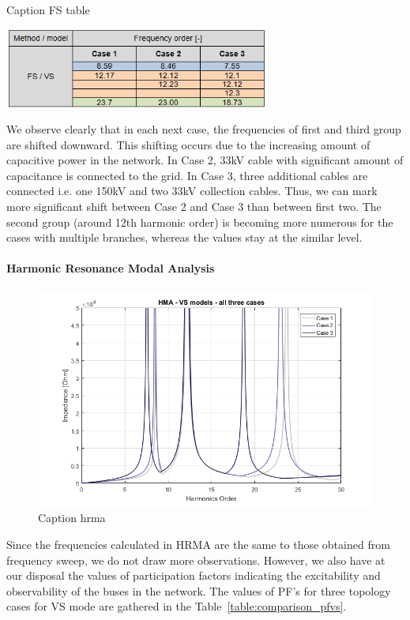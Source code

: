 \documentclass[12pt]{report} %
\begin{document}
\begin{table}[htb]
	\centering
	\caption{Caption FS table}
	\includegraphics[width=0.65\textwidth]{img/Case123/FS_VS_table.png}
  	\label{table:comparison_fsvs}
\end{table}
\FloatBarrier

We observe clearly that in each next case, the frequencies of first and third group are shifted downward. This shifting occurs due to the increasing amount of capacitive power in the network. In Case 2, 33kV cable with significant amount of capacitance is connected to the grid. In Case 3, three additional cables are connected i.e. one 150kV  and two 33kV collection cables. Thus, we can mark more significant shift between Case 2 and Case 3 than between first two.
The second group (around 12th harmonic order) is becoming more numerous for the cases with multiple branches, whereas the values stay at the similar level. 

\paragraph{Harmonic Resonance Modal Analysis}
\begin{figure}[htb]
	\centering
	\includegraphics[width=1\textwidth]{img/Case123/HRMA_VS.png}
	\caption{Caption hrma}
  	\label{fig:comparison_hrmavs}
\end{figure}
\FloatBarrier

Since the frequencies calculated in HRMA are the same to those obtained from frequency sweep, we do not draw more observations. However, we also have at our disposal the values of participation factors indicating the excitability and observability of the buses in the network. The values of PF’s for three topology cases for VS mode are gathered in the Table~\ref{table:comparison_pfvs}.
\end{document}
